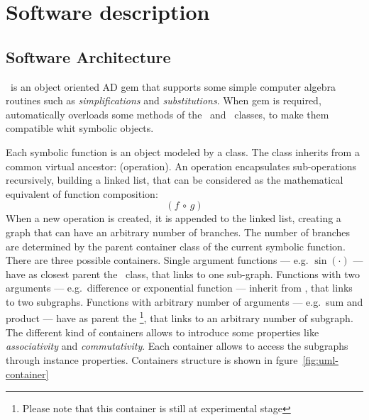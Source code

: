 \section{Software description}
\label{sec:description}


\subsection{Software Architecture}
\label{sec:architecture}


\ragnicas~is an object oriented AD gem that supports some simple computer algebra routines such as \emph{simplifications} and \emph{substitutions}. When gem is required, automatically overloads some methods of the \Fixnum~and \Float~classes, to make them compatible whit symbolic objects.

Each symbolic function is an object modeled by a class. The class inherits from a common virtual ancestor: \CASOp (operation). An operation encapsulates sub-operations recursively, building a linked list, that can be considered as the mathematical equivalent of function composition:
\begin{equation}
\left( f \, \circ \, g \right)
\end{equation}
When a new operation is created, it is appended to the linked list, creating a graph that can have an arbitrary number of branches. The number of branches are determined by the parent container class of the current symbolic function. There are three possible containers. Single argument functions --- e.g. $\sin(\cdot)$ --- have as closest parent the \CASOp~class, that links to one sub-graph. Functions with two arguments --- e.g.\ difference or exponential function --- inherit from \CASBinaryOp, that links to two subgraphs. Functions with arbitrary number of arguments --- e.g.\ sum and product --- have as parent the \CASNaryOp\footnote{Please note that this container is still at experimental stage}, that links to an arbitrary number of subgraph. The different kind of containers allows to introduce some properties like \emph{associativity} and \emph{commutativity}. Each container allows to access the subgraphs through instance properties. Containers structure is shown in fgure~\ref{fig:uml-container}

